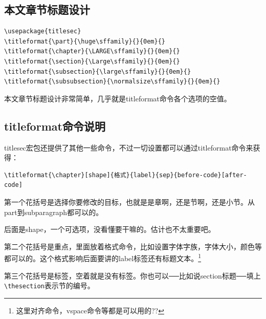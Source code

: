 \documentclass[11pt,oneside]{book}
\begin{document}
\begin{common-format}
\subsection{本文章节标题设计}
\begin{Verbatim}
\usepackage{titlesec}
\titleformat{\part}{\huge\sffamily}{}{0em}{} 
\titleformat{\chapter}{\LARGE\sffamily}{}{0em}{} 
\titleformat{\section}{\Large\sffamily}{}{0em}{}
\titleformat{\subsection}{\large\sffamily}{}{0em}{}
\titleformat{\subsubsection}{\normalsize\sffamily}{}{0em}{}
\end{Verbatim}
本文章节标题设计非常简单，几乎就是titleformat命令各个选项的空值。

\subsection{titleformat命令说明}
titlesec宏包还提供了其他一些命令，不过一切设置都可以通过titleformat命令来获得：
\begin{Verbatim}
\titleformat{\chapter}[shape]{格式}{label}{sep}{before-code}[after-code]
\end{Verbatim}
第一个花括号是选择你要修改的目标，也就是是章啊，还是节啊，还是小节。从part到subparagraph都可以的。

后面是shape，一个可选项，没看懂要干嘛的。估计也不太重要吧。

第二个花括号是重点，里面放着格式命令，比如设置字体字族，字体大小，颜色等都可以的。这个格式影响后面要讲的label标签还有标题文本。\footnote{这里对齐命令，vspace命令等都是可以用的??}

第三个花括号是标签，空着就是没有标签。你也可以──比如说section标题──填上\verb+\thesection+表示节的编号。


\end{common-format}
\end{document}
